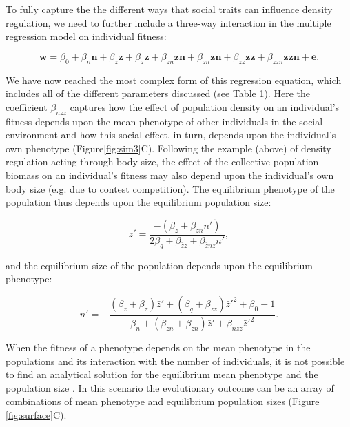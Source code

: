 \documentclass{article}
\begin{document}
To fully capture the the different ways that social traits can influence density regulation, we need to further include a three-way interaction in the multiple regression model on individual fitness:

\begin{equation} 
\mathbf{w}=\beta_{0} +\beta_{n} \mathbf{n} + \beta_{z} \mathbf{z}+ \beta_{\bar{z}} \mathbf{\bar{z}}  +   \beta_{\bar{z}n} \mathbf{\bar{z}n} +   \beta_{zn} \mathbf{zn} + \beta_{\bar{z}z} \mathbf{\bar{z}z}   +   \beta_{\bar{z}zn} \mathbf{z\bar{z}n} + \mathbf{e}.
\end{equation}

\noindent We have now reached the most complex form of this regression equation, which includes all of the different parameters discussed (see Table 1). Here the coefficient $\beta_{n\bar{z}z}$ captures how the effect of population density on an individual's fitness depends upon the mean phenotype of other individuals in the social environment and how this social effect, in turn, depends upon the individual's own phenotype (Figure\ref{fig:sim3}C). Following the example (above) of density regulation acting through body size, the effect of the collective population biomass on an individual's fitness may also depend upon the individual's own body size (e.g. due to contest competition). The equilibrium phenotype of the population thus depends upon the equilibrium population size: 

\begin{equation} 
z'=\frac{-(\beta_{z}+\beta_{zn}n')}{2\beta_{q} + \beta_{\bar{z}z} + \beta_{\bar{z}nz}n'},
\end{equation} 

\noindent and the equilibrium size of the population depends upon the equilibrium phenotype:

\begin{equation}  \label{eq: full}
	n' = -\frac{(\beta_{z}  +  \beta_{\bar{z}})\bar{z}' + (\beta_{q} + \beta_{\bar{z}z})\bar{z}'^2 +\beta_{0} -1}{\beta_{n} + (\beta_{zn} + \beta_{\bar{z}n}) \bar{z}' +  \beta_{n\bar{z}z}\bar{z}'^2}.
\end{equation}

When the fitness of a phenotype depends on the mean phenotype in the populations and its interaction with the number of individuals, it is not possible to find an analytical solution for the equilibrium mean phenotype and the population size \citep{Engen2020}. In this scenario the evolutionary outcome can be an array of combinations of mean phenotype and equilibrium population sizes (Figure \ref{fig:surface}C).
\end{document}
